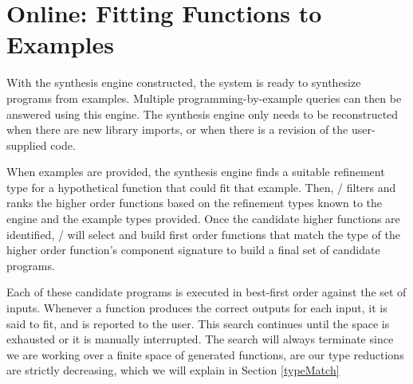 \section{Online: Fitting Functions to Examples} \label{synth}

With the synthesis engine constructed, the system is ready to synthesize programs from examples.
Multiple programming-by-example queries can then be answered using this engine.
The synthesis engine only needs to be reconstructed when there are new library imports, or when there is a revision of the user-supplied code.

When examples are provided, the synthesis engine finds a suitable refinement type for a hypothetical function that could fit that example.
Then, \ourTool/ filters and ranks the higher order functions based on the refinement types known to the engine and the example types provided.
Once the candidate higher functions are identified, \ourTool/ will select and build first order functions that match the type of the higher order function's component signature to build a final set of candidate programs.

Each of these candidate programs is executed in best-first order against the set of inputs.
Whenever a function produces the correct outputs for each input, it is said to fit, and is reported to the user.
This search continues until the space is exhausted or it is manually interrupted. 
The search will always terminate since we are working over a finite space of generated functions, are our type reductions are strictly decreasing, which we will explain in Section \ref{typeMatch}







